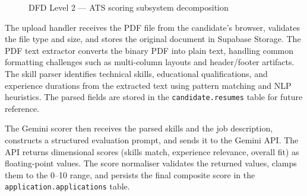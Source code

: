 \begin{figure}[htbp]
\centering
{}
\caption{DFD Level 2 --- ATS scoring subsystem decomposition}
\label{fig:dfd2}
\end{figure}

The upload handler receives the PDF file from the candidate's browser, validates the file type and size, and stores the original document in Supabase Storage. The PDF text extractor converts the binary PDF into plain text, handling common formatting challenges such as multi-column layouts and header/footer artifacts. The skill parser identifies technical skills, educational qualifications, and experience durations from the extracted text using pattern matching and NLP heuristics. The parsed fields are stored in the \texttt{candidate.resumes} table for future reference.

The Gemini scorer then receives the parsed skills and the job description, constructs a structured evaluation prompt, and sends it to the Gemini API. The API returns dimensional scores (skills match, experience relevance, overall fit) as floating-point values. The score normaliser validates the returned values, clamps them to the 0--10 range, and persists the final composite score in the \texttt{application.applications} table.

